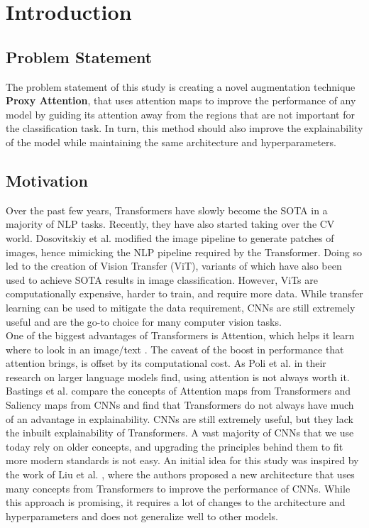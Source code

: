 
\chapter{Introduction}

\section{Problem Statement}
The problem statement of this study is creating a novel augmentation technique \textbf{Proxy Attention}, that uses attention maps to improve the performance of any model by guiding its attention away from the regions that are not important for the classification task.
In turn, this method should also improve the explainability of the model while maintaining the same architecture and hyperparameters.

\section{Motivation}
Over the past few years, Transformers have slowly become the SOTA in a majority of NLP tasks. Recently, they have also started taking over the CV world. Dosovitskiy et al. \cite{dosovitskiyImageWorth16x162021}  modified the image pipeline to generate patches of images, hence mimicking the NLP pipeline required by the Transformer. Doing so led to the creation of Vision Transfer (ViT), variants of which have also been used to achieve SOTA results in image classification. However, ViTs are computationally expensive, harder to train, and require more data. While transfer learning can be used to mitigate the data requirement, CNNs are still extremely useful and are the go-to choice for many computer vision tasks.\\
One of the biggest advantages of Transformers is Attention, which helps it learn where to look in an image/text \cite{vaswaniAttentionAllYou2017}. The caveat of the boost in performance that attention brings, is offset by its computational cost. As Poli et al. \cite{poliHyenaHierarchyLarger2023} in their research on larger language models find, using attention is not always worth it. Bastings et al. \cite{bastingsElephantInterpretabilityRoom2020} compare the concepts of Attention maps from Transformers and Saliency maps from CNNs and find that Transformers do not always have much of an advantage in explainability. CNNs are still extremely useful, but they lack the inbuilt explainability of Transformers. A vast majority of CNNs that we use today rely on older concepts, and upgrading the principles behind them to fit more modern standards is not easy. An initial idea for this study was inspired by the work of Liu et al. \cite{liuConvNet2020s2022}, where the authors proposed a new architecture that uses many concepts from Transformers to improve the performance of CNNs. While this approach is promising, it requires a lot of changes to the architecture and hyperparameters and does not generalize well to other models. \\\\
